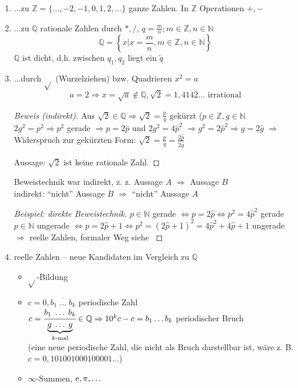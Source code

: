 \begin{enumerate}
 \item ...zu $\mathbb{Z} = \{\ldots,-2,-1,0,1,2,\ldots\}$ ganze Zahlen. In $\mathbb{Z}$ Operationen $+,-$
 \item ...zu $\mathbb{Q}$ rationale Zahlen durch $*,/$, $q=\frac{m}{n}; m \in \mathbb{Z}, n \in \mathbb{N}$
  \begin{equation*}\mathbb{Q} = \left\{x | x=\frac{m}{n}, m \in \mathbb{Z}, n \in \mathbb{N} \right\}\end{equation*}
  $\mathbb{Q}$ ist dicht, d.h. zwischen $q_1, q_2$ liegt ein $\tilde{q}$
 \item ...durch $\sqrt{}$ (Wurzelziehen) bzw. Quadrieren $x^2=a$
 \begin{equation*}a=2 \Rightarrow x = \sqrt{a} \notin \mathbb{Q}, \sqrt{2}=1,4142\ldots\text{ irrational}\end{equation*}

\begin{proof}[Beweis (indirekt)]
Aus $\sqrt{2} \in \mathbb{Q} \Rightarrow \sqrt{2}=\frac{p}{q}$ gekürzt ($p \in \mathbb{Z}, g \in \mathbb{N}$
$2g^2=p^2 \Rightarrow p^2$ gerade $\Rightarrow p=2\hat{p}$ und $2g^2=4\hat{p}^2$
$\Rightarrow g^2 = 2\hat{p}^2 \Rightarrow g=2\hat{g}$ 
$\Rightarrow$ Widerspruch zur gekürzten Form: $\sqrt{2}=\frac{p}{q}=\frac{2\hat{p}}{2\hat{g}}$

Aussage: $\sqrt{2}$ ist keine rationale Zahl.
\end{proof}

Beweistechnik war indirekt, z. z. Aussage $A$ $\Rightarrow$ Aussage $B$\\
indirekt: "`nicht"' Aussage $B$ $\Rightarrow$ "`nicht"' Aussage $A$


\begin{proof}[Beispiel: direkte Beweistechnik]

$p \in \mathbb{N}$ gerade $\Leftrightarrow p = 2 \hat{p} \Leftrightarrow p^2 = 4\hat{p}^2$ gerade\\
$p \in \mathbb{N}$ ungerade $\Leftrightarrow p = 2 \hat{p}+1 \Leftrightarrow p^2 = (2\hat{p}+1)^2=4\hat{p}^2+4\hat{p}+1$ ungerade\\
$\Rightarrow$ reelle Zahlen, formaler Weg siehe \cite[S. 9ff]{bornemann}
\end{proof}

 \item reelle Zahlen -- neue Kandidaten im Vergleich zu $\mathbb{Q}$
\begin{itemize}
 \item $\sqrt{}$-Bildung
 \item $c = 0,\overline{b_1 \;\ldots\; b_k}$ periodische Zahl\\
$c = \cfrac{b_1 \;\ldots\; b_k}{\underbrace{g \;\ldots\; g}_{k\text{-mal}}} \in \mathbb{Q} \Rightarrow 10^k c -c = b_1 \ldots b_k$ periodischer Bruch\\
(eine neue periodische Zahl, die nicht als Bruch darstellbar ist, wäre z. B. $c=0,101001000100001\ldots$)
 \item $\infty$-Summen, $\operatorname{e}, \pi,\ldots$
\end{itemize}

\end{enumerate}

